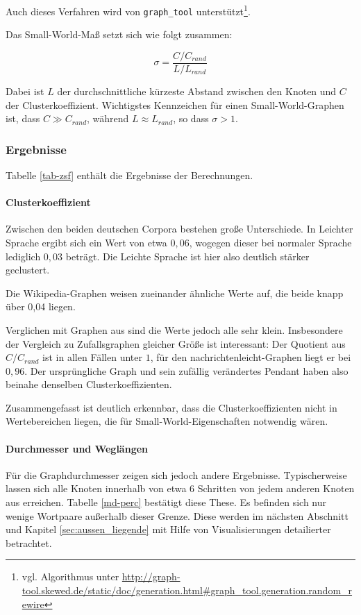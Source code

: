 \documentclass[11pt, a4paper]{article}
\begin{document}
Auch dieses Verfahren wird von \texttt{graph\_tool} unterstützt\footnote{vgl. Algorithmus unter \url{http://graph-tool.skewed.de/static/doc/generation.html\#graph_tool.generation.random_rewire}}.

Das Small-World-Maß setzt sich wie folgt zusammen:

$$
\sigma = \frac{C/C_{rand}}{ L/L_{rand}}
$$

Dabei ist $L$ der durchschnittliche kürzeste Abstand zwischen den Knoten und $C$
der Clusterkoeffizient.
Wichtigstes Kennzeichen für einen Small-World-Graphen ist,
dass $C \gg C_{rand}$, während $L \approx L_{rand}$, so dass $\sigma > 1$.\cite{Humphries2006}

\subsubsection{Ergebnisse}
Tabelle \ref{tab-zsf} enthält die Ergebnisse der Berechnungen.

\paragraph{Clusterkoeffizient}
Zwischen den beiden deutschen Corpora bestehen große Unterschiede.
In Leichter Sprache ergibt sich ein Wert von etwa $0,06$, wogegen dieser bei normaler Sprache lediglich $0,03$ beträgt.
Die Leichte Sprache ist hier also deutlich stärker geclustert.

Die Wikipedia-Graphen weisen zueinander ähnliche Werte auf, die beide knapp über 0,04 liegen.

Verglichen mit Graphen aus \cite[S. 182]{Newman2003} sind die Werte jedoch alle sehr klein.
Insbesondere der Vergleich zu Zufallsgraphen gleicher Größe ist interessant:
Der Quotient aus $C/C_{rand}$ ist in allen Fällen unter $1$, für den nachrichtenleicht-Graphen liegt er bei $0,96$.
Der ursprüngliche Graph und sein zufällig verändertes Pendant haben also beinahe denselben Clusterkoeffizienten.

Zusammengefasst ist deutlich erkennbar, dass die Clusterkoeffizienten nicht in Wertebereichen liegen, die für Small-World-Eigenschaften notwendig wären.

\paragraph{Durchmesser und Weglängen}
Für die Graphdurchmesser zeigen sich jedoch andere Ergebnisse.
Typischerweise lassen sich alle Knoten innerhalb von etwa 6 Schritten von jedem anderen Knoten aus erreichen.
Tabelle \ref{md-perc} bestätigt diese These.
Es befinden sich nur wenige Wortpaare außerhalb dieser Grenze.
Diese werden im nächsten Abschnitt und Kapitel \ref{sec:aussen_liegende} mit Hilfe von Visualisierungen detailierter betrachtet.
\end{document}
